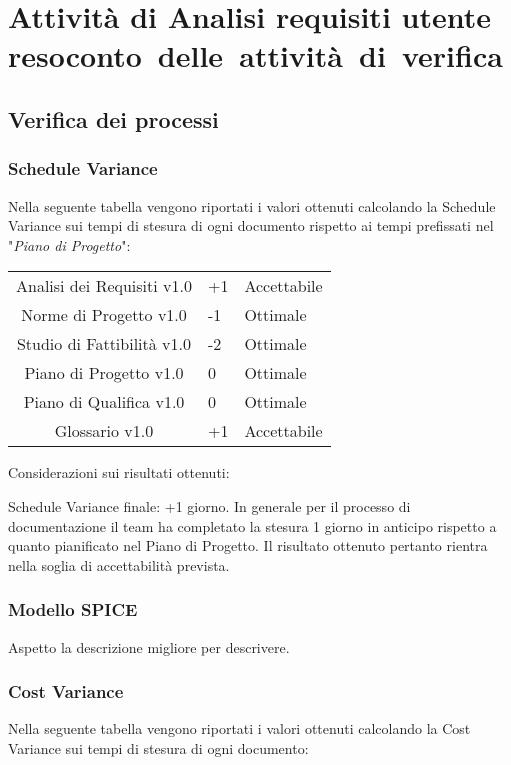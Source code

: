 \newpage
\section{Attività di Analisi requisiti utente \\\large{resoconto~delle~attività~di~verifica}}
\subsection{Verifica dei processi}
\subsubsection{Schedule Variance}
Nella seguente tabella vengono riportati i valori ottenuti calcolando la Schedule Variance sui tempi di stesura di ogni documento rispetto ai tempi prefissati nel "\textit{Piano di Progetto}":

{
	\centering
	\begin{tabular}{| c | R{0.5cm} | C{3cm} |}
	Analisi dei Requisiti v1.0 & +1 & Accettabile \\
	Norme di Progetto v1.0 & -1 & Ottimale \\
	Studio di Fattibilità v1.0 &  -2 &  Ottimale \\
	Piano di Progetto v1.0 &  0 &  Ottimale\\
	Piano di Qualifica v1.0 & 0 & Ottimale \\
	Glossario v1.0 & +1 & Accettabile\\	
	\end{tabular}
	
}

Considerazioni sui risultati ottenuti:

Schedule Variance finale: +1 giorno.
In generale per il processo di documentazione il team ha completato la stesura 1 giorno in anticipo rispetto a quanto pianificato nel Piano di Progetto. Il risultato ottenuto pertanto rientra nella soglia di accettabilità prevista.

\subsubsection{Modello SPICE}
Aspetto la descrizione migliore per descrivere.

\subsubsection{Cost Variance}
Nella seguente tabella vengono riportati i valori ottenuti calcolando la Cost Variance sui tempi di stesura di ogni documento:

